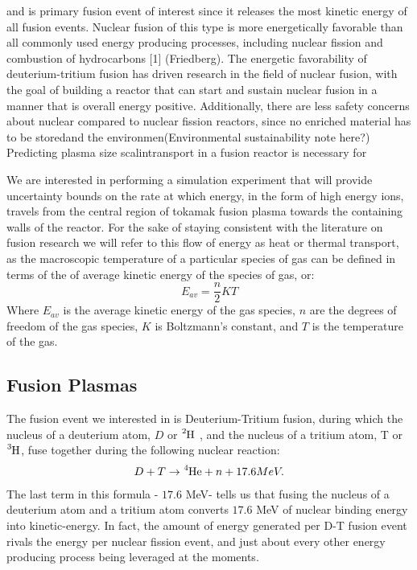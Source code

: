 \documentclass{article}
\begin{document}
and is primary fusion event of interest since it releases the most kinetic energy of all fusion events.  Nuclear fusion of this type is more energetically favorable than all commonly used energy producing processes, including nuclear fission and combustion of hydrocarbons [1] (Friedberg).
The energetic favorability of deuterium-tritium fusion has driven research in the field of nuclear fusion, with the goal of building a reactor that can start and sustain nuclear fusion in a manner that is overall energy positive.
 Additionally, there are less safety concerns about nuclear compared to nuclear fission reactors, since no enriched material has to be storedand the environmen(Environmental sustainability note here?) 
Predicting plasma size scalintransport in a fusion reactor is necessary for 

We are interested in performing a simulation  experiment that will provide uncertainty bounds on the rate at which energy, in the form of high energy ions, travels from the central region of tokamak fusion plasma towards the containing walls of the reactor.
For the sake of staying consistent with the literature on fusion research we will refer to this flow of energy as heat or thermal transport, as the macroscopic temperature of a particular species of gas can be defined in terms of the of average kinetic energy of the species of gas, or:
$$
E_{av} = \frac{n}{2}KT
$$
Where $E_{av}$ is the average kinetic energy of the gas species, $n$ are the degrees of freedom of the gas species, $K$ is  Boltzmann's constant, and $T$ is the temperature of the gas.\\
\subsection{Fusion Plasmas}
The fusion event we interested in is Deuterium-Tritium fusion, during which the nucleus of a deuterium atom, $D$ or $\ce{^{2}H}$ , and the nucleus of a tritium atom, T or $\ce{^{3}H}$, fuse together during the following nuclear reaction:
\begin{align*}
D + T \to \ce{^{4}He} + n + 17.6 MeV.
\end{align*}
The last term in this formula - $17.6 $ MeV- tells us that fusing the nucleus of a deuterium atom and a tritium atom converts $17.6 $ MeV of nuclear binding energy into kinetic-energy. In fact, the amount of energy generated per D-T fusion event rivals the energy per nuclear fission event, and just about every other energy producing process being leveraged at the moments.
\end{document}
